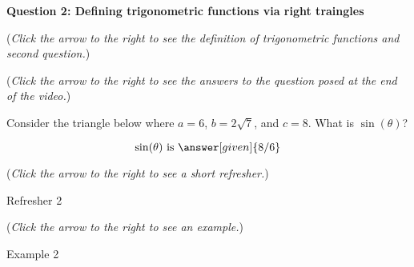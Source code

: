 \documentclass{ximera}
\begin{document}
\textbf{Question 2: Defining trigonometric functions via right traingles}
\begin{question}
\begin{flushright}
{\color{blue}(\emph{Click the arrow to the right to see the definition
of trigonometric functions and second question.})}
\end{flushright}
\begin{center}
\begin{expandable}
{\color{blue}(\emph{Click the arrow to the right to see the answers 
to the question posed at the end of the video.})}
\begin{expandable}
Consider the triangle below where $a = 6$, $b=2\sqrt{7}$,
and $c=8$. What is $\sin( \theta)$?\\
\begin{prompt}
\[
\sin(\theta)\text{ is }\answer[given]{8/6}
\]
\end{prompt}
\begin{flushright}
{\color{blue}(\emph{Click the arrow to the right to see a short refresher.})}
\end{flushright}
\begin{expandable}
Refresher 2
\end{expandable}
\begin{flushright}
{\color{blue}(\emph{Click the arrow to the right to see an example.})}
\end{flushright}
\begin{expandable}
Example 2
\end{expandable}
\end{expandable}
\end{expandable}
\end{center}
\end{question}
\end{document}
